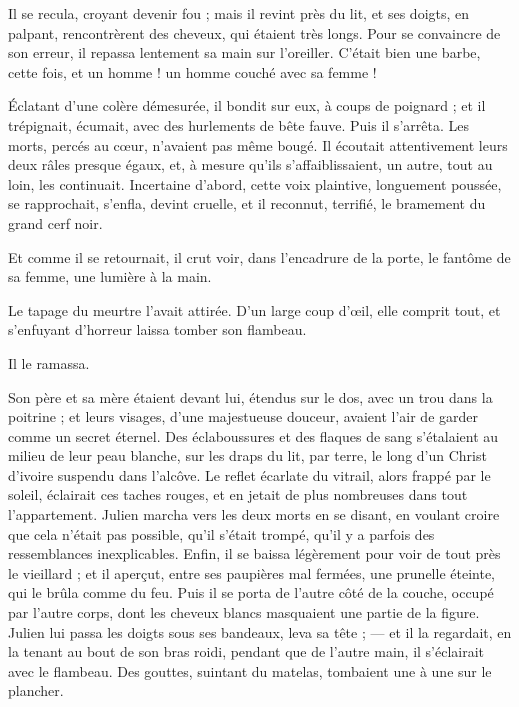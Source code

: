 \documentclass[]{book}
\begin{document}
                Il se recula, croyant devenir fou ; mais il revint près du lit, et ses doigts, en palpant, rencontrèrent des cheveux, qui étaient très longs. Pour se convaincre de son erreur, il repassa lentement sa main sur l'oreiller. C'était bien une barbe, cette fois, et un homme ! un homme couché avec sa femme !
                    
                Éclatant d'une colère démesurée, il bondit sur eux, à coups de poignard ; et il trépignait, écumait, avec des hurlements de bête fauve. Puis il s'arrêta. Les morts, percés au cœur, n'avaient pas même bougé. Il écoutait attentivement leurs deux râles presque égaux, et, à mesure qu'ils s'affaiblissaient, un autre, tout au loin, les continuait. Incertaine d'abord, cette voix plaintive, longuement poussée, se rapprochait, s'enfla, devint cruelle, et il reconnut, terrifié, le bramement du grand cerf noir.
                    
                Et comme il se retournait, il crut voir, dans l'encadrure de la porte, le fantôme de sa femme, une lumière à la main.
                    
                Le tapage du meurtre l'avait attirée. D'un large coup d'œil, elle comprit tout, et s'enfuyant d'horreur laissa tomber son flambeau.
                    
                Il le ramassa.
                    
                Son père et sa mère étaient devant lui, étendus sur le dos, avec un trou dans la poitrine ; et leurs visages, d'une majestueuse douceur, avaient l'air de garder comme un secret éternel. Des éclaboussures et des flaques de sang s'étalaient au milieu de leur peau blanche, sur les draps du lit, par terre, le long d'un Christ d'ivoire suspendu dans l'alcôve. Le reflet écarlate du vitrail, alors frappé par le soleil, éclairait ces taches rouges, et en jetait de plus nombreuses dans tout l'appartement. Julien marcha vers les deux morts en se disant, en voulant croire que cela n'était pas possible, qu'il s'était trompé, qu'il y a parfois des ressemblances inexplicables. Enfin, il se baissa légèrement pour voir de tout près le vieillard ; et il aperçut, entre ses paupières mal fermées, une prunelle éteinte, qui le brûla comme du feu. Puis il se porta de l'autre côté de la couche, occupé par l'autre corps, dont les cheveux blancs masquaient une partie de la figure. Julien lui passa les doigts sous ses bandeaux, leva sa tête ; — et il la regardait, en la tenant au bout de son bras roidi, pendant que de l'autre main, il s'éclairait avec le flambeau. Des gouttes, suintant du matelas, tombaient une à une sur le plancher.
                    
\end{document}
